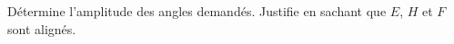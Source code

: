 %
%
Détermine l'amplitude des angles demandés. Justifie en sachant que $E$,
    $H$ et $F$ sont alignés.
